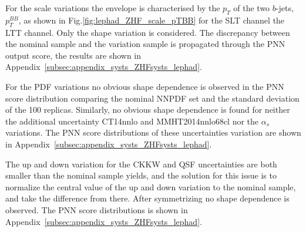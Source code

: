 For the scale variations the envelope is characterised 
by the $p_T$ of the two $b$-jets, $p_T^{BB}$, 
as shown in Fig.\ref{fig:lephad_ZHF_scale_pTBB} for the SLT channel the LTT channel. 
Only the shape variation is considered. The discrepancy between 
the nominal sample and the variation sample 
is propagated through the PNN output score, 
the results are shown in Appendix~\ref{subsec:appendix_systs_ZHFsysts_lephad}.


For the PDF variations no obvious shape dependence 
is observed in the PNN score distribution 
comparing the nominal NNPDF set and the standard deviation 
of the 100 replicas. Similarly, no obvious shape dependence 
is found for neither the additional uncertainty CT14nnlo and MMHT2014nnlo68cl 
nor the $\alpha_s$ variations. 
The PNN score distributions of these uncertainties variation 
are shown in Appendix~\ref{subsec:appendix_systs_ZHFsysts_lephad}. 

The up and down variation for the CKKW and QSF 
uncertainties are both smaller than the nominal sample yields, 
and the solution for this issue is to normalize 
the central value of the up and down variation to the nominal sample, 
and take the difference from there. 
After symmetrizing no shape dependence is observed. 
The PNN score distributions is shown in Appendix~\ref{subsec:appendix_systs_ZHFsysts_lephad}.


